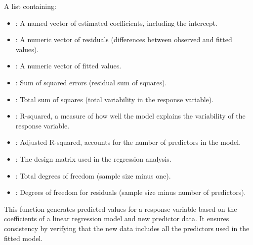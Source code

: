 \documentclass[a4paper]{book}
\begin{document}
\begin{Value}
A list containing:
\begin{itemize}

\item{} : A named vector of estimated coefficients, including the intercept.
\item{} : A numeric vector of residuals (differences between observed and fitted values).
\item{} : A numeric vector of fitted values.
\item{} : Sum of squared errors (residual sum of squares).
\item{} : Total sum of squares (total variability in the response variable).
\item{} : R-squared, a measure of how well the model explains the variability of the response variable.
\item{} : Adjusted R-squared, accounts for the number of predictors in the model.
\item{} : The design matrix used in the regression analysis.
\item{} : Total degrees of freedom (sample size minus one).
\item{} : Degrees of freedom for residuals (sample size minus number of predictors).

\end{itemize}

\end{Value}
%
\begin{Examples}
\end{Examples}
%
\begin{Description}
This function generates predicted values for a response variable based on the coefficients
of a linear regression model and new predictor data. It ensures consistency by verifying
that the new data includes all the predictors used in the fitted model.
\end{Description}
\end{document}
